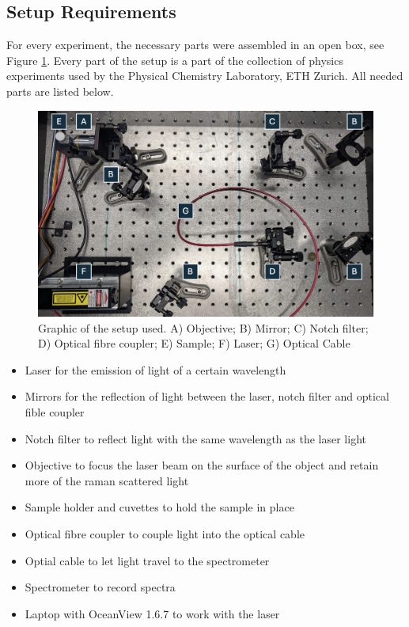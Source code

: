 \subsection{Setup Requirements}
For every experiment, the necessary parts were assembled in an open box, see Figure \ref{fig:setup_photo_numbered}. Every part of the setup is a part of the collection of physics experiments used by the Physical Chemistry Laboratory, ETH Zurich. All needed parts are listed below.
\begin{figure}[ht]
    \centering
    \includegraphics[width=\textwidth]{images/setup_graphics/setup_photo_numbered.png}
    \caption{Graphic of the setup used. A) Objective; B) Mirror; C) Notch filter; D) Optical fibre coupler; E) Sample; F) Laser; G) Optical Cable}
    \label{fig:setup_photo_numbered}
\end{figure}

\begin{itemize}
  \item Laser for the emission of light of a certain wavelength
  \item Mirrors for the reflection of light between the laser, notch filter and optical fible coupler
  \item Notch filter to reflect light with the same wavelength as the laser light
  \item Objective to focus the laser beam on the surface of the object and retain more of the raman scattered light
  \item Sample holder and cuvettes to hold the sample in place
  \item Optical fibre coupler to couple light into the optical cable
  \item Optial cable to let light travel to the spectrometer
  \item Spectrometer to record spectra
  \item Laptop with OceanView 1.6.7 to work with the laser
\end{itemize}

